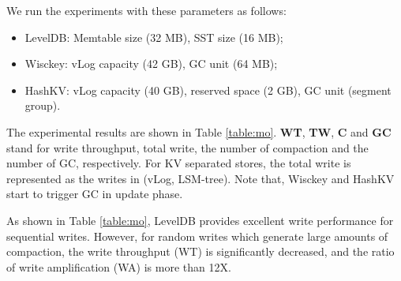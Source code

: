 \documentclass[sigconf]{acmart}
\begin{document}
We run the experiments with these parameters as follows:
\begin{itemize}
	\item LevelDB: Memtable size (32 MB), SST size (16 MB); 
	\item Wisckey: vLog capacity (42 GB), GC unit (64 MB); 
	\item HashKV: vLog capacity (40 GB), reserved space (2 GB), GC unit (segment group).
\end{itemize}


The experimental results are shown in Table \ref{table:mo}. \textbf{WT}, \textbf{TW}, \textbf{C} and \textbf{GC} stand for write throughput, total write, the number of compaction and the number of GC, respectively. For KV separated stores, the total write is represented as the writes in (vLog, LSM-tree). Note that, Wisckey and HashKV start to trigger GC in update phase.
\begin{table}[!t]
	\setlength{\abovecaptionskip}{0.cm}	
	\setlength{\belowcaptionskip}{-0.cm}
	\centering
	\caption{The negative impact of compaction and GC on write performance and write amplification. }
	\label{table:mo}
\end{table}

As shown in Table \ref{table:mo}, LevelDB provides excellent write performance for sequential writes. However, for random writes which generate large amounts of compaction, the write throughput (WT) is significantly decreased, and the ratio of write amplification (WA) is more than 12X. 
\end{document}
